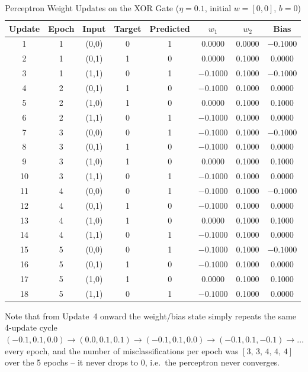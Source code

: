 \documentclass[11pt]{article}
\begin{document}
\begin{table}[H]
\centering
\small
\caption{Perceptron Weight Updates on the XOR Gate ($\eta = 0.1$, initial $w = [0,0]$, $b = 0$)}
\begin{tabular}{@{}cccccccc@{}}
\toprule
\textbf{Update} & \textbf{Epoch} & \textbf{Input} & \textbf{Target} & \textbf{Predicted} & \textbf{$w_1$} & \textbf{$w_2$} & \textbf{Bias} \\
\midrule
1  & 1 & (0,0) & 0 & 1 & 0.0000  & 0.0000 & $-0.1000$ \\
2  & 1 & (0,1) & 1 & 0 & 0.0000  & 0.1000 & 0.0000 \\
3  & 1 & (1,1) & 0 & 1 & $-0.1000$ & 0.1000 & $-0.1000$ \\
4  & 2 & (0,1) & 1 & 0 & $-0.1000$ & 0.1000 & 0.0000 \\
5  & 2 & (1,0) & 1 & 0 & 0.0000  & 0.1000 & 0.1000 \\
6  & 2 & (1,1) & 0 & 1 & $-0.1000$ & 0.1000 & 0.0000 \\
7  & 3 & (0,0) & 0 & 1 & $-0.1000$ & 0.1000 & $-0.1000$ \\
8  & 3 & (0,1) & 1 & 0 & $-0.1000$ & 0.1000 & 0.0000 \\
9  & 3 & (1,0) & 1 & 0 & 0.0000  & 0.1000 & 0.1000 \\
10 & 3 & (1,1) & 0 & 1 & $-0.1000$ & 0.1000 & 0.0000 \\
11 & 4 & (0,0) & 0 & 1 & $-0.1000$ & 0.1000 & $-0.1000$ \\
12 & 4 & (0,1) & 1 & 0 & $-0.1000$ & 0.1000 & 0.0000 \\
13 & 4 & (1,0) & 1 & 0 & 0.0000  & 0.1000 & 0.1000 \\
14 & 4 & (1,1) & 0 & 1 & $-0.1000$ & 0.1000 & 0.0000 \\
15 & 5 & (0,0) & 0 & 1 & $-0.1000$ & 0.1000 & $-0.1000$ \\
16 & 5 & (0,1) & 1 & 0 & $-0.1000$ & 0.1000 & 0.0000 \\
17 & 5 & (1,0) & 1 & 0 & 0.0000  & 0.1000 & 0.1000 \\
18 & 5 & (1,1) & 0 & 1 & $-0.1000$ & 0.1000 & 0.0000 \\
\bottomrule
\end{tabular}
\end{table}

\noindent Note that from Update~4 onward the weight/bias state simply repeats
the same 4-update cycle
$(-0.1,0.1,0.0) \to (0.0,0.1,0.1) \to (-0.1,0.1,0.0) \to (-0.1,0.1,-0.1) \to \dots$
every epoch, and the number of misclassifications per epoch was
$[3,\,3,\,4,\,4,\,4]$ over the 5 epochs -- it never drops to 0, i.e.\ the
perceptron never converges.
\end{document}
